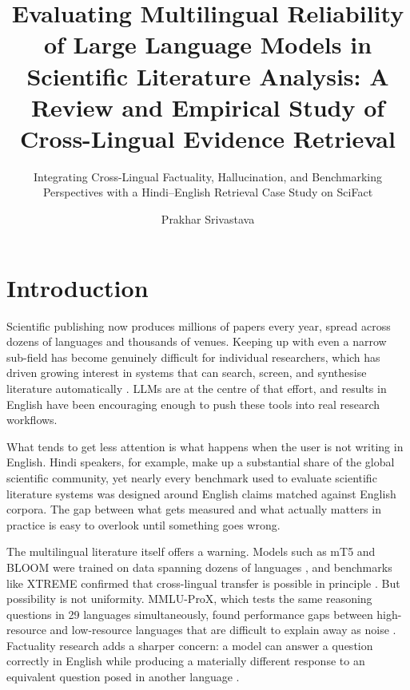 \documentclass[acmsmall,screen,review]{acmart}
\title[Multilingual Reliability of LLMs in Scientific IR]
{Evaluating Multilingual Reliability of Large Language Models in
Scientific Literature Analysis: A Review and Empirical Study of
Cross-Lingual Evidence Retrieval}
\subtitle{Integrating Cross-Lingual Factuality, Hallucination, and
Benchmarking Perspectives with a Hindi--English Retrieval Case Study
on SciFact}
\author{Prakhar Srivastava}
\affiliation{%
  \institution{Department of Information Technology, IIIT Allahabad}
  \country{India}
}
\begin{document}
\maketitle


\section{Introduction}
\label{sec:introduction}

Scientific publishing now produces millions of papers every year, spread
across dozens of languages and thousands of venues.  Keeping up with even
a narrow sub-field has become genuinely difficult for individual
researchers, which has driven growing interest in systems that can search,
screen, and synthesise literature automatically
\citep{scherbakov2025emergence,wu2025automated,tang2025automated}.  LLMs
are at the centre of that effort, and results in English have been
encouraging enough to push these tools into real research workflows.

What tends to get less attention is what happens when the user is not
writing in English.  Hindi speakers, for example, make up a substantial
share of the global scientific community, yet nearly every benchmark used
to evaluate scientific literature systems was designed around English
claims matched against English corpora.  The gap between what gets
measured and what actually matters in practice is easy to overlook until
something goes wrong.

The multilingual literature itself offers a warning.  Models such as mT5
and BLOOM were trained on data spanning dozens of languages
\citep{xue2021mt5,bigscience2022bloom}, and benchmarks like XTREME
confirmed that cross-lingual transfer is possible in principle
\citep{hu2020xtreme}.  But possibility is not uniformity.  MMLU-ProX,
which tests the same reasoning questions in 29 languages simultaneously,
found performance gaps between high-resource and low-resource languages
that are difficult to explain away as noise \citep{xuan2025mmlupro}.
Factuality research adds a sharper concern: a model can answer a question
correctly in English while producing a materially different response to an
equivalent question posed in another language
\citep{qi2023crosslingual,xue2024mlingconf}.
\end{document}
